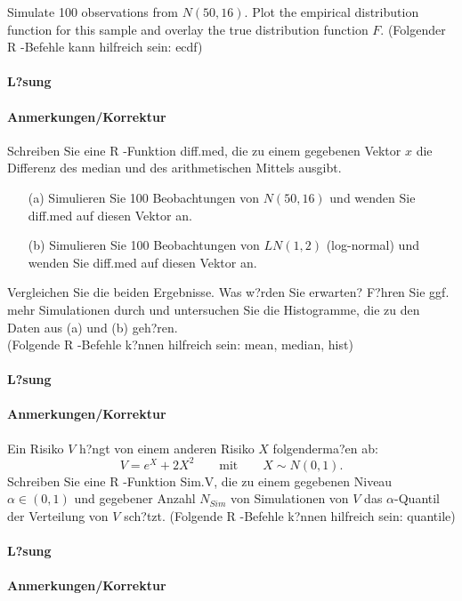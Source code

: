 \documentclass[]{article}
\let\oldparagraph\paragraph
\renewcommand{\paragraph}[1]{\oldparagraph{#1}\mbox{}}
\begin{document}
\begin{auf}
Simulate 100 observations from $N(50,16)$. Plot the empirical distribution function for this sample and overlay the true distribution function $F$.
\newline
\newline
(Folgender {\sffamily R} -Befehle kann hilfreich sein: {\ttfamily ecdf})
\end{auf}

\paragraph{L?sung}

\paragraph{Anmerkungen/Korrektur}

\textcolor{gray}{\hrulefill}

\begin{auf}
Schreiben Sie eine {\sffamily R} -Funktion {\ttfamily diff.med}, die zu einem gegebenen Vektor $x$ die Differenz des median und des arithmetischen Mittels ausgibt.
\begin{enumerate}
    \item[(a)] Simulieren Sie 100 Beobachtungen von $N(50,16)$ und wenden Sie {\ttfamily diff.med} auf diesen Vektor an.
    \item[(b)] Simulieren Sie 100 Beobachtungen von $LN(1,2)$ (log-normal) und wenden Sie {\ttfamily diff.med} auf diesen Vektor an.
    \end{enumerate}
Vergleichen Sie die beiden Ergebnisse. Was w?rden Sie erwarten? F?hren Sie ggf. mehr Simulationen durch und untersuchen Sie die Histogramme, die zu den Daten aus (a) und (b) geh?ren.
\\
(Folgende {\sffamily R} -Befehle k?nnen hilfreich sein: {\ttfamily mean, median, hist})
\end{auf}

\paragraph{L?sung}

\paragraph{Anmerkungen/Korrektur}

\textcolor{gray}{\hrulefill}

\begin{auf}
Ein Risiko $V$ h?ngt von einem anderen Risiko $X$ folgenderma?en ab:
\[
 V=e^X+2 X^2 \qquad \text{mit} \qquad X \sim N(0,1).
 \]
Schreiben Sie eine {\sffamily R} -Funktion {\ttfamily Sim.V}, die zu einem gegebenen Niveau $\alpha \in (0,1)$ und gegebener Anzahl $N_{Sim}$ von Simulationen von $V$ das $\alpha$-Quantil der Verteilung von $V$ sch?tzt.
\newline
\newline
(Folgende {\sffamily R} -Befehle k?nnen hilfreich sein: {\ttfamily quantile})
\end{auf}

\paragraph{L?sung}

\paragraph{Anmerkungen/Korrektur}
\end{document}
